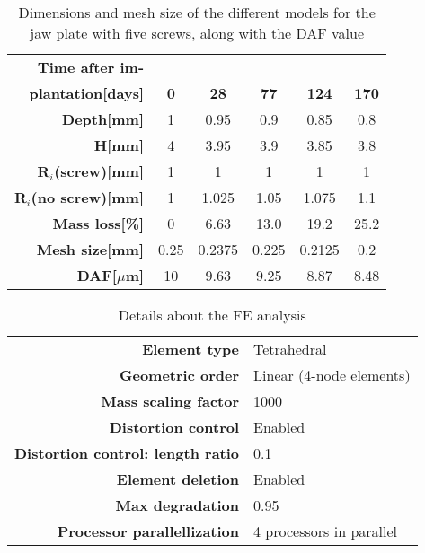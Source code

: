 \begin{table}[h]
\centering
\small
\begin{tabular}{|r|ccccc|}
\hline
\textbf{Time after im-} &  &  &  &  &  \\ 
\textbf{plantation{[}days{]}} & \textbf{0} & \textbf{28} & \textbf{77} & \textbf{124} & \textbf{170} \\ \hline
\textbf{Depth{[}mm{]}}                     & 1          & 0.95        & 0.9         & 0.85         & 0.8          \\
\textbf{H{[}mm{]}}                         & 4          & 3.95        & 3.9         & 3.85         & 3.8          \\
\textbf{R$_i$(screw){[}mm{]}}          & 1          & 1           & 1           & 1           & 1            \\
\textbf{R$_i$(no screw){[}mm{]}}       & 1          & 1.025           & 1.05           & 1.075           & 1.1            \\
\textbf{Mass loss{[}\%{]}}                 & 0          & 6.63        & 13.0        & 19.2         & 25.2         \\
\textbf{Mesh size{[}mm{]}}                 & 0.25       & 0.2375      & 0.225       & 0.2125       & 0.2          \\
\textbf{DAF{[$\mu$}m{]}}    & 10       & 9.63     & 9.25     & 8.87      & 8.48      \\ \hline
\end{tabular}
\caption{Dimensions and mesh size of the different models for the jaw plate with five screws, along with the DAF value}
\label{tab:BPdim}
\end{table}

\begin{table}[h]
\centering
\begin{tabular}{|r|l|}
\hline
\textbf{Element type}                     & Tetrahedral                     \\
\textbf{Geometric order}                  & Linear (4-node elements)        \\
\textbf{Mass scaling factor}              & 1000                            \\
\textbf{Distortion control}               & Enabled                         \\
\textbf{Distortion control: length ratio} & 0.1                             \\
\textbf{Element deletion}                 & Enabled                         \\
\textbf{Max degradation}                  & 0.95                            \\
\textbf{Processor parallellization}       & 4 processors in parallel        \\ \hline
\end{tabular}
\caption{Details about the FE analysis}
\label{tab:abaqus}
\end{table}

